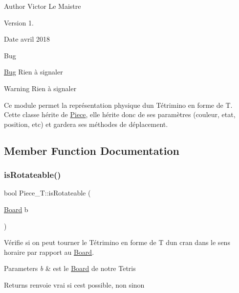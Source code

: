 \begin{DoxyAuthor}{Author}
Victor Le Maistre 
\end{DoxyAuthor}
\begin{DoxyVersion}{Version}
1. 
\end{DoxyVersion}
\begin{DoxyDate}{Date}
avril 2018 
\end{DoxyDate}
\begin{DoxyRefDesc}{Bug}
\item[\hyperlink{bug__bug000016}{Bug}]Rien à signaler \end{DoxyRefDesc}
\begin{DoxyWarning}{Warning}
Rien à signaler
\end{DoxyWarning}
Ce module permet la représentation physique d\textquotesingle{}un Tétrimino en forme de T. Cette classe hérite de \hyperlink{classPiece}{Piece}, elle hérite donc de ses paramètres (couleur, etat, position, etc) et gardera ses méthodes de déplacement. 

\subsection{Member Function Documentation}
\mbox{\label{classPiece__T_a64088f0140b870d178169e36460cd4de}} 
\subsubsection{\texorpdfstring{is\+Rotateable()}{isRotateable()}}
{\footnotesize\ttfamily bool Piece\+\_\+\+T\+::is\+Rotateable (\begin{DoxyParamCaption}\item[{\hyperlink{classBoard}{Board}}]{b }\end{DoxyParamCaption})\hspace{0.3cm}{\ttfamily [virtual]}}



Vérifie si on peut tourner le Tétrimino en forme de T d\textquotesingle{}un cran dans le sens horaire par rapport au \hyperlink{classBoard}{Board}. 


\begin{DoxyParams}{Parameters}
{\em b} & est le \hyperlink{classBoard}{Board} de notre Tetris \\
\hline
\end{DoxyParams}
\begin{DoxyReturn}{Returns}
renvoie vrai si c\textquotesingle{}est possible, non sinon 
\end{DoxyReturn}


